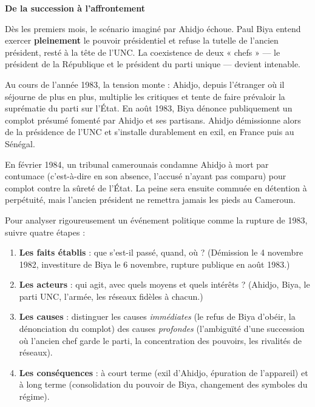 \documentclass[11pt]{article}
\newcommand{\cle}[1]{{\popxbold\color{popdark}#1}}
\newcounter{popsec}
\newcounter{popsub}
\newcommand{\courssub}[1]{%
  \stepcounter{popsub}%
  \par\vspace{9pt}\noindent{\popxbold\fontsize{11.5}{13}\selectfont\color{popink}{\color{poporange}\thepopsec.\thepopsub}\hspace{6pt}#1}\par\nopagebreak\vspace{4pt}
}
\begin{document}
\courssub{La rupture Ahidjo--Biya (1983-1984)}

\textbf{De la succession à l'affrontement}\par

Dès les premiers mois, le scénario imaginé par Ahidjo échoue. Paul Biya entend exercer \textbf{pleinement} le pouvoir présidentiel et refuse la tutelle de l'ancien président, resté à la tête de l'UNC. La coexistence de deux « chefs » — le président de la République et le président du parti unique — devient intenable.

Au cours de l'année 1983, la tension monte : Ahidjo, depuis l'étranger où il séjourne de plus en plus, multiplie les critiques et tente de faire prévaloir la suprématie du parti sur l'État. En \cle{août 1983}, Biya dénonce publiquement un \cle{complot présumé} fomenté par Ahidjo et ses partisans. Ahidjo démissionne alors de la présidence de l'UNC et s'installe durablement en exil, en France puis au \cle{Sénégal}.

En février 1984, un tribunal camerounais condamne Ahidjo à mort \cle{par contumace} (c'est-à-dire en son absence, l'accusé n'ayant pas comparu) pour complot contre la sûreté de l'État. La peine sera ensuite commuée en détention à perpétuité, mais l'ancien président ne remettra jamais les pieds au Cameroun.

\begin{methode}
Pour analyser rigoureusement un événement politique comme la rupture de 1983, suivre quatre étapes :
\begin{enumerate}
\item \textbf{Les faits établis} : que s'est-il passé, quand, où ? (Démission le 4 novembre 1982, investiture de Biya le 6 novembre, rupture publique en août 1983.)
\item \textbf{Les acteurs} : qui agit, avec quels moyens et quels intérêts ? (Ahidjo, Biya, le parti UNC, l'armée, les réseaux fidèles à chacun.)
\item \textbf{Les causes} : distinguer les causes \emph{immédiates} (le refus de Biya d'obéir, la dénonciation du complot) des causes \emph{profondes} (l'ambiguïté d'une succession où l'ancien chef garde le parti, la concentration des pouvoirs, les rivalités de réseaux).
\item \textbf{Les conséquences} : à court terme (exil d'Ahidjo, épuration de l'appareil) et à long terme (consolidation du pouvoir de Biya, changement des symboles du régime).
\end{enumerate}
\end{methode}
\end{document}

